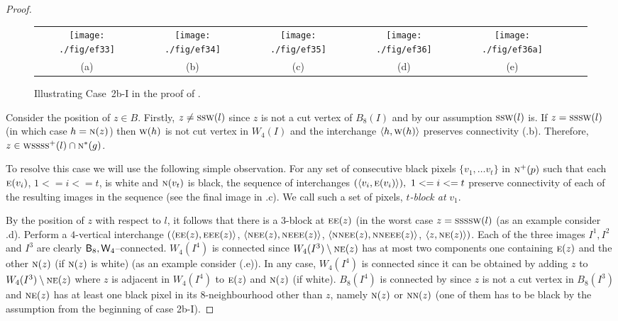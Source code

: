 \documentclass[lotsofwhite,charterfonts]{patmorin}
\newcommand{\eightfour}{\ensuremath{\protect\textup{\textsf{B}}_{8},\protect\textup{\textsf{W}}_{4}}}
\newcommand{\N}{\textsc{n}}
\newcommand{\NE}{\textsc{ne}}
\newcommand{\E}{\textsc{e}}
\renewcommand{\S}{\textsc{s}}
\newcommand{\W}{\textsc{w}}
\newcommand{\ic}[2]{\langle #1,#2 \rangle}
\newcommand{\sm}{\ensuremath{\setminus}}
\begin{document}
\begin{proof}
\begin{figure}[htbp]
\begin{center}
\begin{tabular}{ccccccc}
\texttt{[image: ./fig/ef33]} & 
\texttt{[image: ./fig/ef34]} & 
\texttt{[image: ./fig/ef35]} &  
\texttt{[image: ./fig/ef36]} &
\texttt{[image: ./fig/ef36a]} 
\\
(a) & (b) & (c) & (d) & (e)
\end{tabular}
\end{center}
\caption{Illustrating Case~2b-I in the proof of .}
\end{figure}


Consider the position of $z\in B$. Firstly, $z\not=\S\S\W(l)$ since $z$ is not a cut vertex of $B_8(I)$ and by our assumption $\S\S\W(l)$ is. If $z=\S\S\S\W(l)$  (in which case $h=\N(z)$) then $\W(h)$ is not cut vertex in $W_4(I)$ and the interchange $\ic{h}{\W(h)}$ preserves connectivity  (.b). Therefore, $z\in \W\S\S\S\S^+(l) \cap \N^*(g)$.

To resolve this case we will use the following simple observation. For any  set of consecutive black pixels $\{v_1, \dots v_t\}$ in $\N^+(p)$ such that each $\E(v_i)$, $1<=i<=t$, is white and $\N(v_t)$ is black, the sequence of interchanges $(\ic{v_i}{\E(v_i)}),\ 1<=i<=t$ preserve connectivity of each of the resulting images in the sequence (see the final image in .c). We call such a set of pixels, {\em $t$-block at} $v_1$. 

By the position of $z$ with respect to $l$, it follows that there is a $3$-block at $\E\E(z)$ (in the worst case $z=\S\S\S\S\W(l)$ (as an example consider .d). Perform a  $4$-vertical interchange $(\ic{\E\E(z)}{\E\E\E(z)}$, $\ic{\NE\E(z)}{\NE\E\E(z)}$, $\ic{\N\NE\E(z)}{\N\NE\E\E(z)}$, $\ic{z}{\NE(z)})$. Each of the three images $I^1, I^2$ and $I^3$ are clearly $\eightfour$--connected. $W_4(I^4)$ is connected since $W_4(I^3)\sm \NE(z)$ has at most two components one containing $\E(z)$ and the other $\N(z)$ (if $\N(z)$ is white) (as an example consider (.e)). In any case, $W_4(I^4)$ is connected since it can be obtained by adding $z$ to $W_4(I^3)\sm \NE(z)$ where $z$ is adjacent in $W_4(I^4)$ to $\E(z)$ and $\N(z)$ (if white). $B_8(I^4)$ is connected by  since $z$ is not a cut vertex in $B_8(I^3)$ and $\NE(z)$ has at least one black pixel in its $8$-neighbourhood other than $z$, namely $\N(z)$ or $\N\N(z)$ (one of them has to be black by the assumption from the beginning of case 2b-I).


\end{proof}
\end{document}
